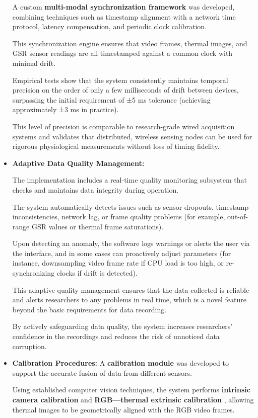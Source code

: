 \begin{itemize}
A custom \textbf{multi-modal synchronization framework}
 was developed, combining techniques such as timestamp alignment with a network time
 protocol, latency compensation, and periodic clock calibration.

This synchronization engine ensures that video frames, thermal images, and GSR sensor
readings are all timestamped against a common clock with minimal drift.

Empirical tests show that the system consistently maintains temporal precision on the
order of only a few milliseconds of drift between devices, surpassing the initial
requirement of ±5 ms tolerance (achieving approximately ±3 ms in practice).

This level of precision is comparable to research-grade wired acquisition systems and
validates that distributed, wireless sensing nodes can be used for rigorous
physiological measurements without loss of timing fidelity.

\item \textbf{Adaptive Data Quality Management:}

The implementation includes a real-time quality monitoring subsystem that checks and
maintains data integrity during operation.

The system automatically detects issues such as sensor dropouts, timestamp
inconsistencies, network lag, or frame quality problems (for example, out-of-range
GSR values or thermal frame saturations).

Upon detecting an anomaly, the software logs warnings or alerts the user via the
interface, and in some cases can proactively adjust parameters (for instance,
downsampling video frame rate if CPU load is too high, or re-synchronizing clocks if
drift is detected).

This adaptive quality management ensures that the data collected is reliable and
alerts researchers to any problems in real time, which is a novel feature beyond the
basic requirements for data recording.

By actively safeguarding data quality, the system increases researchers' confidence
in the recordings and reduces the risk of unnoticed data corruption.

\item \textbf{Calibration Procedures:}
 A \textbf{calibration module}
 was developed to support the accurate fusion of data from different sensors.

Using established computer vision techniques, the system performs \textbf{intrinsic
camera calibration}
 and \textbf{RGB---thermal extrinsic calibration}
, allowing thermal images to be geometrically aligned with the RGB video frames.


\end{itemize}
